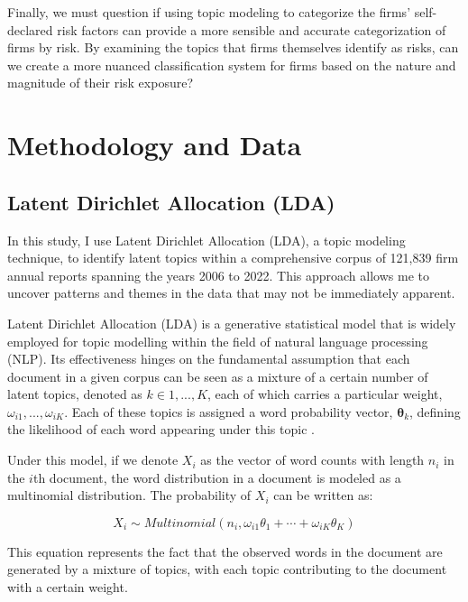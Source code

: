 \documentclass[12pt, letterpaper]{article}
\begin{document}
Finally, we must question if using topic modeling to categorize the firms' self-declared risk factors can provide a more sensible and accurate categorization of firms by risk. By examining the topics that firms themselves identify as risks, can we create a more nuanced classification system for firms based on the nature and magnitude of their risk exposure?

\section{Methodology and Data}

\subsection{Latent Dirichlet Allocation (LDA)}

In this study, I use Latent Dirichlet Allocation (LDA), a topic modeling technique, to identify latent topics within a comprehensive corpus of 121,839 firm annual reports spanning the years 2006 to 2022. This approach allows me to uncover patterns and themes in the data that may not be immediately apparent.

Latent Dirichlet Allocation (LDA) is a generative statistical model that is widely employed for topic modelling within the field of natural language processing (NLP). Its effectiveness hinges on the fundamental assumption that each document in a given corpus can be seen as a mixture of a certain number of latent topics, denoted as $k \in {1, ..., K}$, each of which carries a particular weight, $\omega_{i1}, ..., \omega_{iK}$. Each of these topics is assigned a word probability vector, $\mathbf{\theta}_k$, defining the likelihood of each word appearing under this topic \cite{Blei2003-ay}.

Under this model, if we denote $X_i$ as the vector of word counts with length $n_i$ in the $i$th document, the word distribution in a document is modeled as a multinomial distribution. The probability of $X_i$ can be written as:

\begin{equation}
X_i \sim Multinomial\left(n_i, \omega_{i 1} \theta_1+\cdots+\omega_{i K} \theta_K\right)
\end{equation}

This equation represents the fact that the observed words in the document are generated by a mixture of topics, with each topic contributing to the document with a certain weight.
\end{document}
